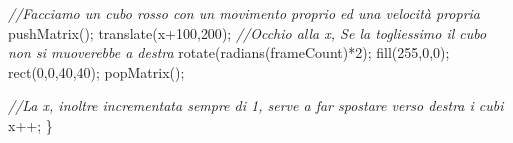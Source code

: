 \documentclass[
]{article}
\newenvironment{Shaded}{}{}
\newcommand{\CommentTok}[1]{\textcolor[rgb]{0.38,0.63,0.69}{\textit{#1}}}
\newcommand{\DecValTok}[1]{\textcolor[rgb]{0.25,0.63,0.44}{#1}}
\newcommand{\FunctionTok}[1]{\textcolor[rgb]{0.02,0.16,0.49}{#1}}
\newcommand{\NormalTok}[1]{#1}
\newcommand{\OperatorTok}[1]{\textcolor[rgb]{0.40,0.40,0.40}{#1}}
\begin{document}
\begin{Shaded}
\begin{Highlighting}[]
\CommentTok{//Facciamo un cubo rosso con un movimento proprio ed una velocità propria}
    \FunctionTok{pushMatrix}\OperatorTok{();}
    \FunctionTok{translate}\OperatorTok{(}\NormalTok{x}\OperatorTok{+}\DecValTok{100}\OperatorTok{,}\DecValTok{200}\OperatorTok{);}  \CommentTok{//Occhio alla x, Se la togliessimo il cubo non si muoverebbe a destra}
    \FunctionTok{rotate}\OperatorTok{(}\FunctionTok{radians}\OperatorTok{(}\NormalTok{frameCount}\OperatorTok{)*}\DecValTok{2}\OperatorTok{);}
    \FunctionTok{fill}\OperatorTok{(}\DecValTok{255}\OperatorTok{,}\DecValTok{0}\OperatorTok{,}\DecValTok{0}\OperatorTok{);}
    \FunctionTok{rect}\OperatorTok{(}\DecValTok{0}\OperatorTok{,}\DecValTok{0}\OperatorTok{,}\DecValTok{40}\OperatorTok{,}\DecValTok{40}\OperatorTok{);}
    \FunctionTok{popMatrix}\OperatorTok{();}

 \CommentTok{//La x, inoltre incrementata sempre di 1, serve a far spostare verso destra i cubi}
\NormalTok{    x}\OperatorTok{++;}
\OperatorTok{\}}
\end{Highlighting}
\end{Shaded}
\end{document}
